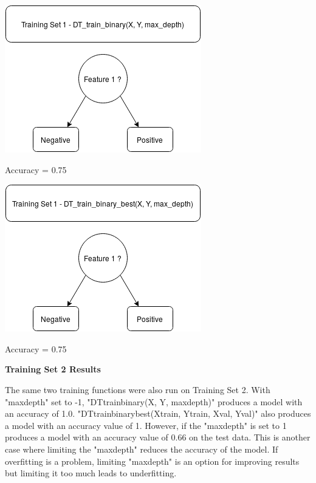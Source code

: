 \documentclass{article}
\begin{document}
\begin{center}
    \includegraphics[scale=0.75]{Train1.png}
    
    \noindent Accuracy = 0.75
    
\end{center}

\begin{center}
    \includegraphics[scale=.75]{Train1best.png}
    
    \noindent Accuracy = 0.75
     
\end{center}

\noindent \textbf{Training Set 2 Results}

\indent The same two training functions were also run on Training Set 2. With "max\textunderscore depth" set to -1, "DT\textunderscore train\textunderscore binary(X, Y, max\textunderscore depth)" produces a model with an accuracy of 1.0. "DT\textunderscore train\textunderscore binary\textunderscore best(X\textunderscore train, Y\textunderscore train, X\textunderscore val, Y\textunderscore val)" also produces a model with an accuracy value of 1. However, if the "max\textunderscore depth" is set to 1 produces a model with an accuracy value of 0.66 on the test data. This is another case where limiting the "max\textunderscore depth" reduces the accuracy of the model. If overfitting is a problem, limiting "max\textunderscore depth" is an option for improving results but limiting it too much leads to underfitting. 
\end{document}
